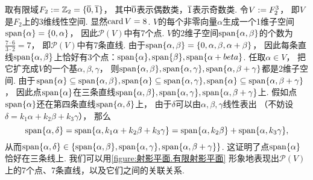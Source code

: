 \begin{example}
取有限域\(F_2 \defeq \mathbb{Z}_2 = \{\EquivalenceClassO{0},\EquivalenceClassO{1}\}\)，
其中\(\EquivalenceClassO{0}\)表示偶数类，\(\EquivalenceClassO{1}\)表示奇数类.
令\(V := F_2^3\)，
即\(V\)是\(F_2\)上的3维线性空间.
显然\(\operatorname{card} V = 8\).
\(V\)的每个非零向量\(\alpha\)生成一个1维子空间\(\operatorname{span}\{\alpha\} = \{0,\alpha\}\)，
因此\(\mathcal{P}(V)\)中有7个点.
\(V\)的2维子空间\(\operatorname{span}\{\alpha,\beta\}\)的个数为\(
	\frac{7\cdot6}{3\cdot2} = 7
\)，
即\(\mathcal{P}(V)\)中有7条直线.
由于\(
	\operatorname{span}\{\alpha,\beta\}
	= \{0,\alpha,\beta,\alpha+\beta\}
\)，
因此每条直线\(\operatorname{span}\{\alpha,\beta\}\)上恰好有3个点：\(
	\operatorname{span}\{\alpha\},
	\operatorname{span}\{\beta\},
	\operatorname{span}\{\alpha+beta\}
\).
任取\(\alpha \in V\)，
把它扩充成\(V\)的一个基\(\alpha,\beta,\gamma\)，
则\(
	\operatorname{span}\{\alpha,\beta\},
	\operatorname{span}\{\alpha,\gamma\},
	\operatorname{span}\{\alpha,\beta+\gamma\}
\)都是2维子空间.
由于\(
	\operatorname{span}\{\alpha\} \subseteq \operatorname{span}\{\alpha,\beta\},
	\operatorname{span}\{\alpha\} \subseteq \operatorname{span}\{\alpha,\gamma\},
	\operatorname{span}\{\alpha\} \subseteq \operatorname{span}\{\alpha,\beta+\gamma\}
\)，
因此点\(\operatorname{span}\{\alpha\}\)在三条直线\(
	\operatorname{span}\{\alpha,\beta\},
	\operatorname{span}\{\alpha,\gamma\},
	\operatorname{span}\{\alpha,\beta+\gamma\}
\)上.
假如点\(\operatorname{span}\{\alpha\}\)还在第四条直线\(\operatorname{span}\{\alpha,\delta\}\)上，
由于\(\delta\)可以由\(\alpha,\beta,\gamma\)线性表出
（不妨设\(\delta = k_1 \alpha + k_2 \beta + k_3 \gamma\)），
那么\begin{equation*}
	\operatorname{span}\{\alpha,\delta\}
	= \operatorname{span}\{\alpha,k_1 \alpha + k_2 \beta + k_3 \gamma\}
	= \operatorname{span}\{\alpha,k_2 \beta\} + \operatorname{span}\{\alpha,k_3 \gamma\},
\end{equation*}
从而\(
	\operatorname{span}\{\alpha,\delta\}
	\in
	\{
		\operatorname{span}\{\alpha,\beta\},
		\operatorname{span}\{\alpha,\gamma\},
		\operatorname{span}\{\alpha,\beta+\gamma\}
	\}
\).
这证明了点\(\operatorname{span}\{\alpha\}\)恰好在三条线上.
我们可以用\cref{figure:射影平面.有限射影平面}
形象地表现出\(\mathcal{P}(V)\)上的7个点、7条直线，以及它们之间的关联关系.
\begin{figure}[hbt]
	\centering
\end{figure}
\end{example}

